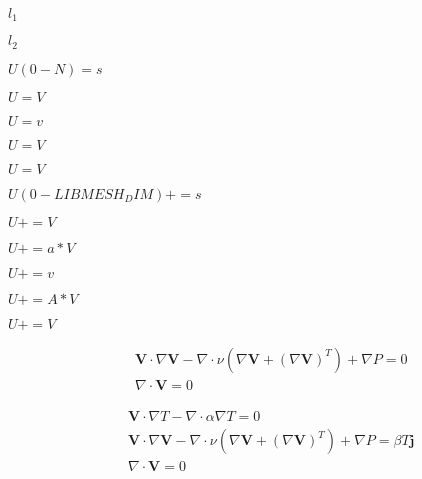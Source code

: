 \documentclass{article}
\begin{document}
$l_1$
\pagebreak

$l_2$
\pagebreak

$U(0-N) = s$
\pagebreak

$U = V$
\pagebreak

$ U=v $
\pagebreak

$U=V$
\pagebreak

$ U=V $
\pagebreak

$U(0-LIBMESH_DIM)+=s$
\pagebreak

$U+=V$
\pagebreak

$U+=a*V$
\pagebreak

$ U+=v $
\pagebreak

$U+=A*V$
\pagebreak

$ U+=V $
\pagebreak

\begin{eqnarray*}
&& \mathbf{V} \cdot \nabla \mathbf{V} - \nabla \cdot \nu (\nabla \mathbf{V} +(\nabla \mathbf{V})^T)
+\nabla P = 0 \\
&& \nabla \cdot \mathbf{V} = 0
\end{eqnarray*}
\pagebreak

\begin{eqnarray*}
&& \mathbf{V} \cdot \nabla T - \nabla \cdot\alpha \nabla T = 0 \\
&& \mathbf{V} \cdot \nabla \mathbf{V} - \nabla \cdot \nu (\nabla \mathbf{V} +(\nabla \mathbf{V})^T)
+\nabla P = \beta T \mathbf{j} \\
&& \nabla \cdot \mathbf{V} = 0
\end{eqnarray*}
\pagebreak
\end{document}
